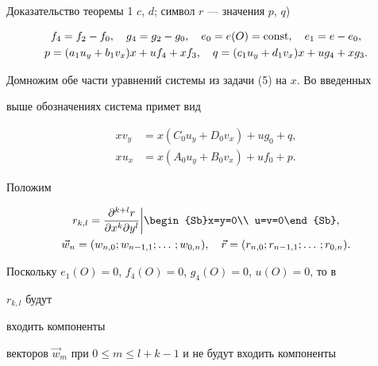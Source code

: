 \begin{pf*}{Доказательство теоремы 1}
$c$, $d$; символ $r$ --- значения $p$, $q$)


\begin{gather*}


f_4=f_2-f_0,\quad g_4=g_2-g_0,\quad


e_0=e(O)=\const,\quad e_1=e-e_0,\\


p=(a_1u_y+b_1v_x)x+uf_4+xf_3,\quad


q=(c_1u_y+d_1v_x)x+ug_4+xg_3.


\end{gather*}


Домножим обе части уравнений системы из задачи (5) на $x$. Во введенных


выше обозначениях система примет вид


\begin{equation}


\begin{split}


xv_y&=x(C_0u_y+D_0v_x)+ug_0+q,\\


xu_x&=x(A_0u_y+B_0v_x)+uf_0+p.


\end{split}


\end{equation}





Положим


\begin{gather*}


r_{k,l}=


\biggl.\frac{\partial^{k+l}r}{\partial x^k\partial y^l}\biggr|


\begin{Sb}x=y=0\\ u=v=0\end{Sb},\\


\Vec w_n=(w_{n,0};w_{n-1,1};\dotsc;w_{0,n}),\quad


\Vec r=(r_{n,0};r_{n-1,1};\dotsc;r_{0,n}).


\end{gather*}





Поскольку $e_1(O)=0$, $f_4(O)=0$, $g_4(O)=0$, $u(O)=0$, то в


$r_{k,l}$ будут


входить компоненты


векторов $\Vec w_m$ при $0\le m\le l+k-1$ и не будут входить компоненты



\end{pf*}
